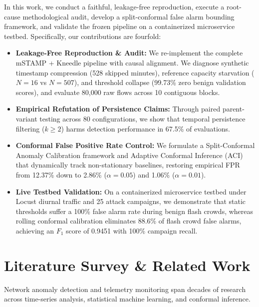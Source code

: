 \documentclass[10pt,twocolumn]{article}
\begin{document}
In this work, we conduct a faithful, leakage-free reproduction, execute a root-cause methodological audit, develop a split-conformal false alarm bounding framework, and validate the frozen pipeline on a containerized microservice testbed. Specifically, our contributions are fourfold:
\begin{itemize}
    \item \textbf{Leakage-Free Reproduction \& Audit:} We re-implement the complete mSTAMP + Kneedle pipeline with causal alignment. We diagnose synthetic timestamp compression (528 skipped minutes), reference capacity starvation ($N=16$ vs $N=507$), and threshold collapse (99.73\% zero benign validation scores), and evaluate 80,000 raw flows across 10 contiguous blocks.
    \item \textbf{Empirical Refutation of Persistence Claims:} Through paired parent-variant testing across 80 configurations, we show that temporal persistence filtering ($k \ge 2$) harms detection performance in 67.5\% of evaluations.
    \item \textbf{Conformal False Positive Rate Control:} We formulate a Split-Conformal Anomaly Calibration framework and Adaptive Conformal Inference (ACI) that dynamically track non-stationary baselines, restoring empirical FPR from 12.37\% down to 2.86\% ($\alpha=0.05$) and 1.06\% ($\alpha=0.01$).
    \item \textbf{Live Testbed Validation:} On a containerized microservice testbed under Locust diurnal traffic and 25 attack campaigns, we demonstrate that static thresholds suffer a 100\% false alarm rate during benign flash crowds, whereas rolling conformal calibration eliminates 88.6\% of flash crowd false alarms, achieving an $F_1$ score of 0.9451 with 100\% campaign recall.
\end{itemize}

\section{Literature Survey \& Related Work}
Network anomaly detection and telemetry monitoring span decades of research across time-series analysis, statistical machine learning, and conformal inference.
\end{document}
